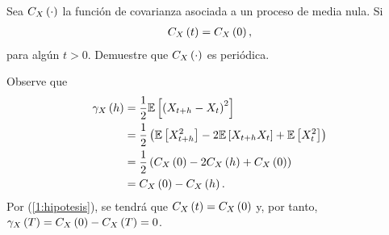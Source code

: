 \documentclass[../main.tex]{subfiles}
\begin{document}
    \begin{enunciado}
    	Sea $C_X\left( \cdot \right)$ la función de covarianza asociada a un proceso de media nula. Si
            \begin{align}
                \label{1:hipotesis}
            	C_X\left( t \right) = C_X\left( 0 \right),
            \end{align}
        para algún $t > 0$. Demuestre que $C_X\left( \cdot \right)$ es periódica.
    \end{enunciado}

    \begin{demostracion}
        Observe que
            \begin{align*}
            	\gamma_X\left( h \right) &= \frac 1 2 \mathbb{E} \left[ \left( X_{t+h} - X_t \right)^2 \right]\\
            	&= \frac 1 2 \left( \mathbb{E} \left[ X_{t+h}^2 \right] - 2 \mathbb{E} \left[ X_{t+h}X_t \right] + \mathbb{E} \left[ X_t^2 \right] \right)\\
            	&= \frac 1 2 \left( C_X\left( 0 \right) - 2 C_X\left( h \right) + C_X\left( 0 \right) \right)\\
            	&= C_X\left( 0 \right) - C_X\left( h \right).
            \end{align*}
        Por (\ref{1:hipotesis}), se tendrá que $C_X\left( t \right) = C_X\left( 0 \right)$ y, por tanto, $\gamma_X\left( T \right) = C_X\left( 0 \right) - C_X\left( T \right) = 0$.
    \end{demostracion}
\end{document}
